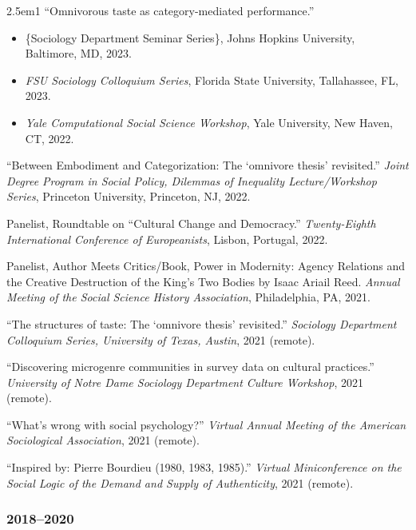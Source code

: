 \documentclass[
]{article}
\providecommand{\tightlist}{%
  \setlength{\itemsep}{0pt}\setlength{\parskip}{0pt}}
\newenvironment{cventry}{\begin{hangparas}{2.5em}{1}}{\end{hangparas}}
\begin{document}
\begin{cventry}
``Omnivorous taste as category-mediated performance.''

\begin{itemize}
\tightlist
\item
  \{Sociology Department Seminar Series\}, Johns Hopkins University,
  Baltimore, MD, 2023.
\item
  \emph{FSU Sociology Colloquium Series}, Florida State University,
  Tallahassee, FL, 2023.
\item
  \emph{Yale Computational Social Science Workshop}, Yale University,
  New Haven, CT, 2022.
\end{itemize}

``Between Embodiment and Categorization: The `omnivore thesis'
revisited.'' \emph{Joint Degree Program in Social Policy, Dilemmas of
Inequality Lecture/Workshop Series}, Princeton University, Princeton,
NJ, 2022.

Panelist, Roundtable on ``Cultural Change and Democracy.''
\emph{Twenty-Eighth International Conference of Europeanists}, Lisbon,
Portugal, 2022.

Panelist, Author Meets Critics/Book, Power in Modernity: Agency
Relations and the Creative Destruction of the King's Two Bodies by Isaac
Ariail Reed. \emph{Annual Meeting of the Social Science History
Association}, Philadelphia, PA, 2021.

``The structures of taste: The `omnivore thesis' revisited.''
\emph{Sociology Department Colloquium Series, University of Texas,
Austin}, 2021 (remote).

``Discovering microgenre communities in survey data on cultural
practices.'' \emph{University of Notre Dame Sociology Department Culture
Workshop}, 2021 (remote).

``What's wrong with social psychology?'' \emph{Virtual Annual Meeting of
the American Sociological Association}, 2021 (remote).

``Inspired by: Pierre Bourdieu (1980, 1983, 1985).'' \emph{Virtual
Miniconference on the Social Logic of the Demand and Supply of
Authenticity}, 2021 (remote).

\end{cventry}

\subsubsection{2018--2020}\label{section-22}
\end{document}
